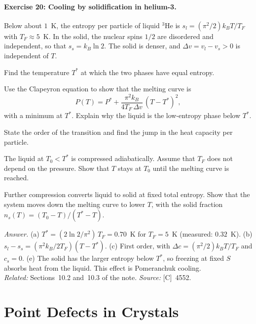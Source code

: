 \documentclass[11pt]{article}      %
\numberwithin{equation}{section}   %
\begin{document}
\paragraph{Exercise 20: Cooling by solidification in helium-3.}
Below about $1$~K, the entropy per particle of liquid $^3$He is $s_l = (\pi^2/2)k_BT/T_F$ with $T_F \approx 5$~K. In the solid, the nuclear spins $1/2$ are disordered and independent, so that $s_s = k_B\ln 2$. The solid is denser, and $\Delta v = v_l - v_s > 0$ is independent of $T$.
\begin{parts}
    \item Find the temperature $T^*$ at which the two phases have equal entropy.
    \item Use the Clapeyron equation to show that the melting curve is
    \begin{equation*}
        P(T) = P^* + \frac{\pi^2k_B}{4T_F\,\Delta v}\,(T - T^*)^2,
    \end{equation*}
    with a minimum at $T^*$. Explain why the liquid is the low-entropy phase below $T^*$.
    \item State the order of the transition and find the jump in the heat capacity per particle.
    \item The liquid at $T_0 < T^*$ is compressed adiabatically. Assume that $T_F$ does not depend on the pressure. Show that $T$ stays at $T_0$ until the melting curve is reached.
    \item Further compression converts liquid to solid at fixed total entropy. Show that the system moves down the melting curve to lower $T$, with the solid fraction $n_s(T) = (T_0 - T)/(T^* - T)$.
\end{parts}
\textit{Answer.} (a) $T^* = (2\ln 2/\pi^2)\,T_F = 0.70$~K for $T_F = 5$~K (measured: $0.32$~K). (b) $s_l - s_s = (\pi^2k_B/2T_F)(T - T^*)$. (c) First order, with $\Delta c = (\pi^2/2)k_BT/T_F$ and $c_s = 0$. (e) The solid has the larger entropy below $T^*$, so freezing at fixed $S$ absorbs heat from the liquid. This effect is Pomeranchuk cooling.\\
\textit{Related:} Sections~10.2 and~10.3 of the note. \textit{Source:} [C]~4552.

\section{Point Defects in Crystals}
\end{document}
